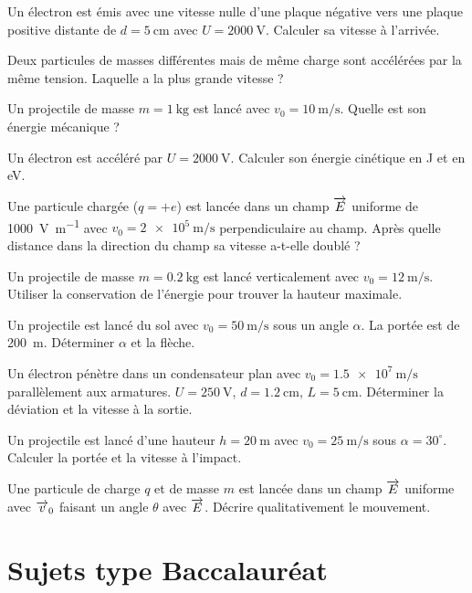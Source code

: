 \exo{} Un électron est émis avec une vitesse nulle d’une plaque négative vers une plaque positive distante de $d=\SI{5}{\centi\metre}$ avec $U=\SI{2000}{\volt}$. Calculer sa vitesse à l’arrivée.

\exo{} Deux particules de masses différentes mais de même charge sont accélérées par la même tension. Laquelle a la plus grande vitesse ?


\exo{} Un projectile de masse $m=\SI{1}{\kilogram}$ est lancé avec $v_0=\SI{10}{\metre\per\second}$. Quelle est son énergie mécanique ?

\exo{} Un électron est accéléré par $U=\SI{2000}{\volt}$. Calculer son énergie cinétique en \si{\joule} et en \si{\electronvolt}.

\exo{} Une particule chargée ($q=+e$) est lancée dans un champ $\overrightarrow{E}$ uniforme de \SI{1000}{\volt\per\metre} avec $v_0=\SI{2e5}{\metre\per\second}$ perpendiculaire au champ. Après quelle distance dans la direction du champ sa vitesse a-t-elle doublé ?

\exo{} Un projectile de masse $m=\SI{0.2}{\kilogram}$ est lancé verticalement avec $v_0=\SI{12}{\metre\per\second}$. Utiliser la conservation de l’énergie pour trouver la hauteur maximale.


\exo{} Un projectile est lancé du sol avec $v_0=\SI{50}{\metre\per\second}$ sous un angle $\alpha$. La portée est de \SI{200}{\metre}. Déterminer $\alpha$ et la flèche.

\exo{} Un électron pénètre dans un condensateur plan avec $v_0=\SI{1.5e7}{\metre\per\second}$ parallèlement aux armatures. $U=\SI{250}{\volt}$, $d=\SI{1.2}{\centi\metre}$, $L=\SI{5}{\centi\metre}$. Déterminer la déviation et la vitesse à la sortie.

\exo{} Un projectile est lancé d’une hauteur $h=\SI{20}{\metre}$ avec $v_0=\SI{25}{\metre\per\second}$ sous $\alpha=30^\circ$. Calculer la portée et la vitesse à l’impact.

\exo{} Une particule de charge $q$ et de masse $m$ est lancée dans un champ $\overrightarrow{E}$ uniforme avec $\overrightarrow{v}_0$ faisant un angle $\theta$ avec $\overrightarrow{E}$. Décrire qualitativement le mouvement.

\section{Sujets type Baccalauréat}

